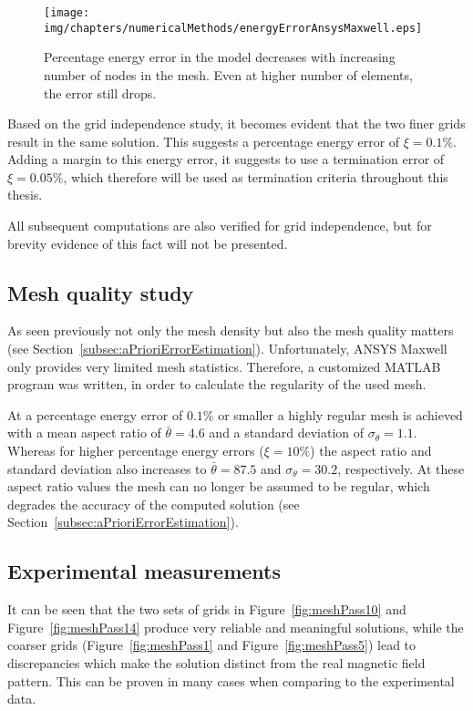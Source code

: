 \begin{figure}[htb]
  \centering
      \texttt{[image: img/chapters/numericalMethods/energyErrorAnsysMaxwell.eps]}
  \caption[Percentage energy error in finite element system]{Percentage energy error in the model decreases with increasing number of nodes in the mesh. Even at higher number of elements, the error still drops.}
  \label{fig:energyErrorAnsysMaxwell}
\end{figure}

Based on the grid independence study, it becomes evident that the two finer grids result in the same solution. This suggests a percentage energy error of $\xi=0.1\%$. Adding a margin to this energy error, it suggests to use a termination error of $\xi=0.05\%$, which therefore will be used as termination criteria throughout this thesis.

All subsequent computations are also verified for grid independence, but for brevity evidence of this fact will not be presented.

\subsection{Mesh quality study}
\label{subsec:meshQualityStudy}
As seen previously not only the mesh density but also the mesh quality matters (see Section~\ref{subsec:aPrioriErrorEstimation}). Unfortunately, ANSYS Maxwell only provides very limited mesh statistics. Therefore, a customized MATLAB program was written, in order to calculate the regularity of the used mesh. 

At a percentage energy error of $0.1\%$ or smaller a highly regular mesh is achieved with a mean aspect ratio of $\bar{\theta}=4.6$ and a standard deviation of $\sigma_{\theta}=1.1$. Whereas for higher percentage energy errors ($\xi=10\%$) the aspect ratio and standard deviation also increases to $\bar{\theta}=87.5$ and $\sigma_{\theta}=30.2$, respectively. At these aspect ratio values the mesh can no longer be assumed to be regular, which degrades the accuracy of the computed solution (see Section~\ref{subsec:aPrioriErrorEstimation}).

\subsection{Experimental measurements}
\label{subsec:experimentalMeasurements}
It can be seen that the two sets of grids in Figure~\ref{fig:meshPass10} and Figure~\ref{fig:meshPass14} produce very reliable and meaningful solutions, while the coarser grids (Figure~\ref{fig:meshPass1} and Figure~\ref{fig:meshPass5}) lead to discrepancies which make the solution distinct from the real magnetic field pattern. This can be proven in many cases when comparing to the experimental data. 


